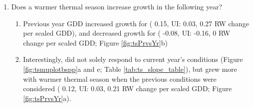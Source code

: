 \documentclass{article}\usepackage[]{graphicx}\usepackage[]{xcolor}
\begin{document}
\begin{enumerate}
\begin{enumerate}
  \item No clear trend of growing season length effect across our eleven species and season predictors. %
  \item Results reported as means and 90\% uncertainty intervals (UI) that correspond to ring width change in mm on the log scale---henseforth "RW" per scaled predictor (one week (seven days) of average spring growing degree days (GDD); (58.32) for the thermal season, one week of growing season length (GSL) for the calendar season, one week of leafout for the start of season (SOS) and one week of of budset for the end of season (EOS). %

  \item Longer thermal season did not increase growth for any species and decreased growth for {\Ball} (
  -0.08, UI:
  -0.12,
  -0.03 RW change per scaled GDD; Figure \ref{fig:tsmuplotbspp}a and e; Table \ref{tab:ts_slope_table}).
  
  \item No species responded to longer calendar season (Figure \ref{fig:tsmuplotbspp}b and f; Table \ref{tab:ts_slope_table}).

  \item On a scaled axis (z-scored), both GDD and GSL were similarly predictive (Figure \ref{fig:bsppZscored})

  \end{enumerate}

\item Does a warmer thermal season increase growth in the following year?
  \begin{enumerate}
  
  \item Previous year GDD increased growth for {\Ball} (
  0.15, UI:
  0.03,
  0.27 RW change per scaled GDD),
  and decreased growth for {\Bnig} (
  -0.08, UI:
  -0.16,
  0 RW change per scaled GDD; Figure \ref{fig:tsPrvsYr}b)
  
  \item Interestingly, {\Bnig} did not solely respond to current year's conditions (Figure \ref{fig:tsmuplotbspp}a and e; Table \ref{tab:ts_slope_table}), but grew more with warmer thermal season when the previous conditions were considered (
  0.12, UI:
  0.03,
  0.21 RW change per scaled GDD; Figure \ref{fig:tsPrvsYr}a).
  

\end{enumerate}
\end{enumerate}
\end{document}
